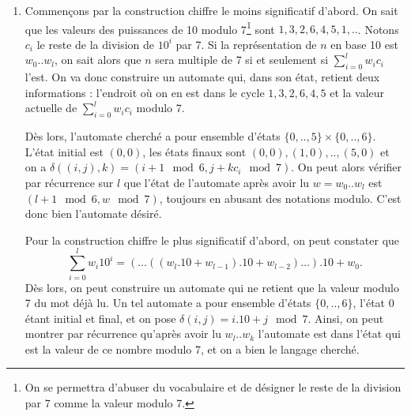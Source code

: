 \begin{sol}
\begin{enumerate}
\item Commençons par la construction chiffre le moins significatif d'abord. On sait que les valeurs des puissances de 10 modulo 7\footnote{On se permettra d'abuser du vocabulaire et de désigner le reste de la division par 7 comme la valeur modulo 7.} sont $1,3,2,6,4,5,1,..$. Notons $c_i$ le reste de la division de $10^i$ par 7. Si la représentation de $n$ en base 10 est $w_0..w_l$, on sait alors que $n$ sera multiple de 7 si et seulement si $\sum_{i=0}^l w_ic_i$ l'est. On va donc construire un automate qui, dans son état, retient deux informations : l'endroit où on en est dans le cycle $1,3,2,6,4,5$ et la valeur actuelle de $\sum_{i=0}^l w_ic_i$ modulo 7.

Dès lors, l'automate cherché a pour ensemble d'états $\{0,..,5\}\times\{0,..,6\}$. L'état initial est $(0,0)$, les états finaux sont $(0,0),(1,0),..,(5,0)$ et on a $\delta((i,j),k)=(i+1 \mod 6, j+kc_i \mod 7)$. On peut alors vérifier par récurrence sur $l$ que l'état de l'automate après avoir lu $w=w_0..w_l$ est $(l+1\mod 6, w\mod 7)$, toujours en abusant des notations modulo. C'est donc bien l'automate désiré.

Pour la construction chiffre le plus significatif d'abord, on peut constater que
\[\sum_{i=0}^l w_i10^i= (\dots((w_l.10+w_{l-1}).10+w_{l-2})\dots).10+w_0.\]
Dès lors, on peut construire un automate qui ne retient que la valeur modulo 7 du mot déjà lu. Un tel automate a pour ensemble d'états $\{0,..,6\}$, l'état $0$ étant initial et final, et on pose $\delta(i,j)=i.10+j \mod 7$. Ainsi, on peut montrer par récurrence qu'après avoir lu $w_l..w_k$ l'automate est dans l'état qui est la valeur de ce nombre modulo 7, et on a bien le langage cherché.
\end{enumerate}
\end{sol}

